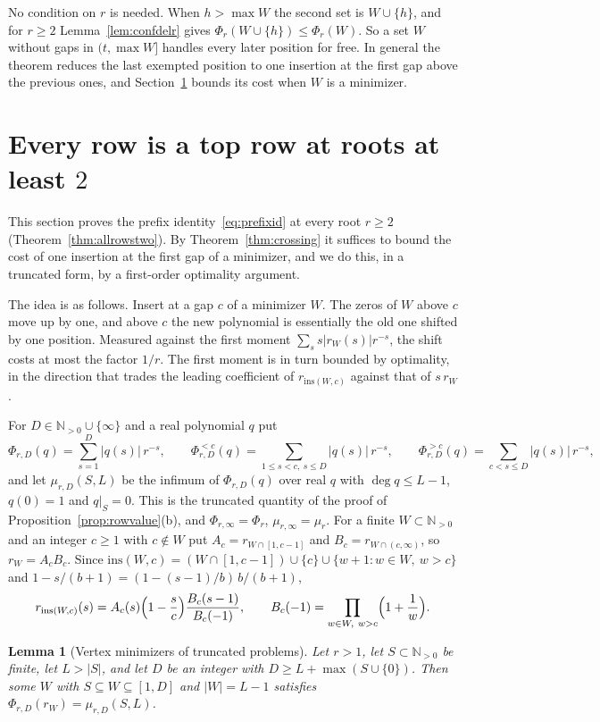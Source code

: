 \documentclass[11pt]{article}
\newtheorem{lemma}[theorem]{Lemma}
\newcommand{\N}{\mathbb N}
\begin{document}
No condition on $r$ is needed.  When $h>\max W$ the second set is
$W\cup\{h\}$, and for $r\ge2$ Lemma~\ref{lem:confdelr} gives
$\Phi_r(W\cup\{h\})\le\Phi_r(W)$.  So a set $W$ without gaps in
$(t,\max W]$ handles every later position for free.  In general the theorem
reduces the last exempted position to one insertion at the first gap above
the previous ones, and Section~\ref{sec:allrowstwo} bounds its cost when
$W$ is a minimizer.

\section{Every row is a top row at roots at least \texorpdfstring{$2$}{2}}\label{sec:allrowstwo}

This section proves the prefix identity~\eqref{eq:prefixid} at every root $r\ge2$
(Theorem~\ref{thm:allrowstwo}).  By Theorem~\ref{thm:crossing} it suffices
to bound the cost of one insertion at the first gap of a minimizer, and we
do this, in a truncated form, by a first-order optimality argument.

The idea is as follows.  Insert at a gap $c$ of a minimizer $W$.  The zeros of $W$
above $c$ move up by one, and above $c$ the new polynomial is essentially
the old one shifted by one position.  Measured against the first moment
$\sum_ss|r_W(s)|r^{-s}$, the shift costs at most the factor $1/r$.  The
first moment is in turn bounded by optimality, in the direction that trades
the leading coefficient of $r_{\mathrm{ins}(W,c)}$ against that of $s\,r_W$.

For $D\in\N_{>0}\cup\{\infty\}$ and a real polynomial $q$ put
\[
  \Phi_{r,D}(q)=\sum_{s=1}^{D}|q(s)|\,r^{-s},\qquad
  \Phi_{r,D}^{<c}(q)=\sum_{1\le s<c,\ s\le D}|q(s)|\,r^{-s},\qquad
  \Phi_{r,D}^{>c}(q)=\sum_{c<s\le D}|q(s)|\,r^{-s},
\]
and let $\mu_{r,D}(S,L)$ be the infimum of $\Phi_{r,D}(q)$ over real $q$ with
$\deg q\le L-1$, $q(0)=1$ and $q|_S=0$.  This is the truncated quantity of the
proof of Proposition~\ref{prop:rowvalue}(b), and
$\Phi_{r,\infty}=\Phi_r$, $\mu_{r,\infty}=\mu_r$.  For a finite
$W\subset\N_{>0}$ and an integer $c\ge1$ with $c\notin W$ put
$A_c=r_{W\cap[1,c-1]}$ and $B_c=r_{W\cap(c,\infty)}$, so $r_W=A_cB_c$.  Since
$\mathrm{ins}(W,c)=(W\cap[1,c-1])\cup\{c\}\cup\{w+1:w\in W,\ w>c\}$ and
$1-s/(b+1)=(1-(s-1)/b)\,b/(b+1)$,
\[
  r_{\mathrm{ins}(W,c)}(s)=A_c(s)\Bigl(1-\frac sc\Bigr)\frac{B_c(s-1)}{B_c(-1)},
  \qquad B_c(-1)=\prod_{w\in W,\ w>c}\Bigl(1+\frac1w\Bigr).
\]

\begin{lemma}[Vertex minimizers of truncated problems]\label{lem:truncvertex}
Let $r>1$, let $S\subset\N_{>0}$ be finite, let $L>|S|$, and let $D$ be an
integer with $D\ge L+\max(S\cup\{0\})$.  Then some $W$ with
$S\subseteq W\subseteq[1,D]$ and $|W|=L-1$ satisfies
$\Phi_{r,D}(r_W)=\mu_{r,D}(S,L)$.
\end{lemma}
\end{document}
